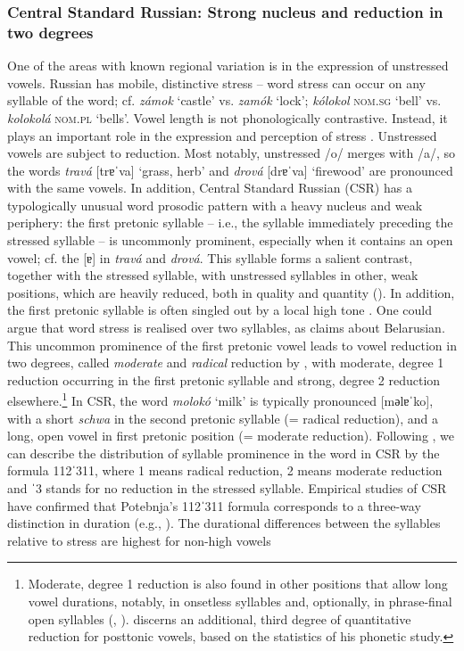 \documentclass[output=paper]{langscibook}
\begin{document}
\subsubsection{Central Standard Russian: Strong nucleus and reduction in two degrees}
\label{sec:post:1.2.1}
One of the areas with known regional variation is in the expression of unstressed vowels. Russian has mobile, distinctive stress -- word stress can occur on any syllable of the word; cf. \textit{{}zámok} `castle' vs. \textit{zamók} `lock'; \textit{{}kólokol} \textsc{nom.sg} `bell' vs. \textit{kolokolá} \textsc{nom.pl} `bells'. Vowel length is not phonologically contrastive. Instead, it plays an important role in the expression and perception of stress \citep[219]{Bondarko1998}. Unstressed vowels are subject to reduction. Most notably, unstressed \mbox{/o/} merges with \mbox{/a/}, so the words \textit{travá} [trɐˈva] ‘grass, herb’ and \textit{drová} [drɐˈva] ‘firewood’ are pronounced with the same vowels. In addition, Central Standard Russian (CSR) has a typologically unusual word prosodic pattern with a heavy nucleus and weak periphery: the first pretonic syllable -- i.e., the syllable immediately preceding the stressed syllable -- is uncommonly prominent, especially when it contains an open vowel; cf. the [ɐ] in \textit{travá} and \textit{drová}. This syllable forms a salient contrast, together with the stressed syllable, with unstressed syllables in other, weak positions, which are heavily reduced, both in quality and quantity (\citealt{Zlatoustova1981, Kodzasov1999}). In addition, the first pretonic syllable is often singled out by a local high tone \citep{Kasatkina2005}. One could argue that word stress is realised over two syllables, as \citet[175]{Dubina2012} claims about Belarusian. This uncommon prominence of the first pretonic vowel leads to vowel reduction in two degrees, called \textit{moderate} and \textit{radical} reduction by \citet{Crosswhite2000}, with moderate, degree 1 reduction occurring in the first pretonic syllable and strong, degree 2 reduction elsewhere.\footnote{Moderate, degree 1 reduction is also found in other positions that allow long vowel durations, notably, in onsetless syllables and, optionally, in phrase-final open syllables (\citealt{Barnes2006}, \citealt[534]{Iosad2012}). \citet{Kuznecov1997} discerns an additional, third degree of quantitative reduction for posttonic vowels, based on the statistics of his phonetic study.} In CSR, the word \textit{molokó} `milk' is typically pronounced [mәlɐˈko], with a short \textit{schwa} in the second pretonic syllable (= radical reduction), and a long, open vowel in first pretonic position (= moderate reduction). Following \citet{Potebnja1866}, we can describe the distribution of syllable prominence in the word in CSR by the formula \mbox{112ˈ311}, where 1 means radical reduction, 2 means moderate reduction and ˈ3 stands for no reduction in the stressed syllable. Empirical studies of CSR have confirmed that Potebnja’s \mbox{112ˈ311} formula corresponds to a three-way distinction in duration (e.g., \citealt{BondarkoEtAl1966, Zlatoustova1981, Kuznecov1997, Barnes2006, Knjazev2006}). The durational differences between the syllables relative to stress are highest for non-high vowels 
\end{document}
